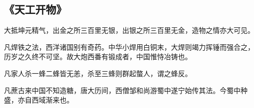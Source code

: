 \subsection{《天工开物》}
大抵坤元精气，出金之所三百里无银，出银之所三百里无金，造物之情亦大可见。

凡焊铁之法，西洋诸国别有奇药。中华小焊用白铜末，大焊则竭力挥锤而强合之，历岁之久终不可坚。故大炮西番有锻成者，中国惟恃冶铸也。

凡家人杀一蜂二蜂皆无恙，杀至三蜂则群起螫人，谓之蜂反。

凡蔗古来中国不知造糖，唐大历间，西僧邹和尚游蜀中遂宁始传其法。今蜀中种盛，亦自西域渐来也。
